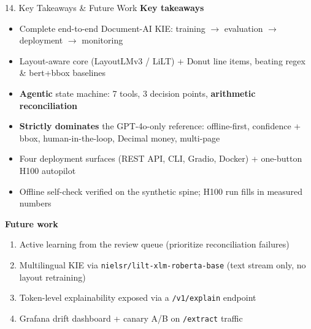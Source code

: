 \documentclass[10pt,aspectratio=169]{beamer}
\begin{document}
\begin{frame}{14. Key Takeaways \& Future Work}
\textbf{Key takeaways}
\begin{itemize}\small
  \item Complete end-to-end Document-AI KIE: training $\to$ evaluation $\to$ deployment $\to$ monitoring
  \item Layout-aware core (LayoutLMv3 / LiLT) + Donut line items, beating regex \& bert+bbox baselines
  \item \textbf{Agentic} state machine: 7 tools, 3 decision points, \textbf{arithmetic reconciliation}
  \item \textbf{Strictly dominates} the GPT-4o-only reference: offline-first, confidence + bbox, human-in-the-loop, Decimal money, multi-page
  \item Four deployment surfaces (REST API, CLI, Gradio, Docker) + one-button H100 autopilot
  \item Offline self-check verified on the synthetic spine; H100 run fills in measured numbers
\end{itemize}

\textbf{Future work}
\begin{enumerate}\small
  \item Active learning from the review queue (prioritize reconciliation failures)
  \item Multilingual KIE via \texttt{nielsr/lilt-xlm-roberta-base} (text stream only, no layout retraining)
  \item Token-level explainability exposed via a \texttt{/v1/explain} endpoint
  \item Grafana drift dashboard + canary A/B on \texttt{/extract} traffic
\end{enumerate}
\end{frame}
\end{document}
